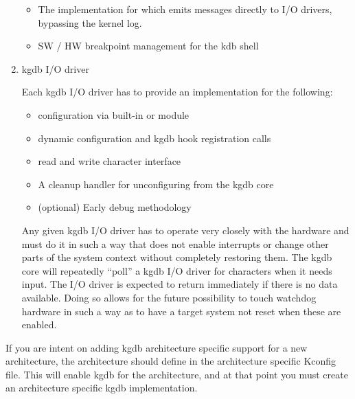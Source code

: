 \documentclass[a4paper,8pt,english]{sphinxmanual}
\begin{document}
\begin{enumerate}
\begin{itemize}
\begin{itemize}
\end{itemize}

\item {} 
The implementation for  which emits messages directly
to I/O drivers, bypassing the kernel log.

\item {} 
SW / HW breakpoint management for the kdb shell

\end{itemize}

\item {} 
kgdb I/O driver

Each kgdb I/O driver has to provide an implementation for the
following:
\begin{itemize}
\item {} 
configuration via built-in or module

\item {} 
dynamic configuration and kgdb hook registration calls

\item {} 
read and write character interface

\item {} 
A cleanup handler for unconfiguring from the kgdb core

\item {} 
(optional) Early debug methodology

\end{itemize}

Any given kgdb I/O driver has to operate very closely with the
hardware and must do it in such a way that does not enable interrupts
or change other parts of the system context without completely
restoring them. The kgdb core will repeatedly ``poll'' a kgdb I/O
driver for characters when it needs input. The I/O driver is expected
to return immediately if there is no data available. Doing so allows
for the future possibility to touch watchdog hardware in such a way
as to have a target system not reset when these are enabled.

\end{enumerate}

If you are intent on adding kgdb architecture specific support for a new
architecture, the architecture should define  in the
architecture specific Kconfig file. This will enable kgdb for the
architecture, and at that point you must create an architecture specific
kgdb implementation.
\end{document}
